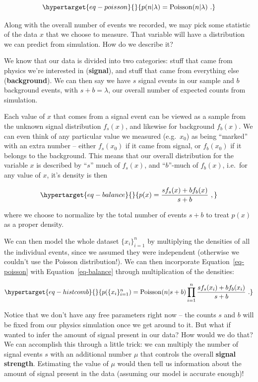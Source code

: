 \documentclass[
  11pt,
  numbers=noendperiod]{book}
\begin{document}
\begin{equation}\protect\hypertarget{eq-poisson}{}{
p(n|\lambda) = \mathrm{Poisson}(n|\lambda)~.
}\label{eq-poisson}\end{equation}

Along with the overall number of events we recorded, we may pick some
statistic of the data \(x\) that we choose to measure. That variable
will have a distribution we can predict from simulation. How do we
describe it?

We know that our data is divided into two categories: stuff that came
from physics we're interested in (\textbf{signal}), and stuff that came
from everything else (\textbf{background}). We can then say we have
\(s\) signal events in our sample and \(b\) background events, with
\(s+b=\lambda\), our overall number of expected counts from simulation.

Each value of \(x\) that comes from a signal event can be viewed as a
sample from the unknown signal distribution \(f_s(x)\), and likewise for
background \(f_b(x)\). We can even think of any particular value we
measured (e.g.~\(x_0\)) as being ``marked'' with an extra number --
either \(f_s(x_0)\) if it came from signal, or \(f_b(x_0)\) if it
belongs to the background. This means that our overall distribution for
the variable \(x\) is described by ``\(s\)'' much of \(f_s(x)\), and
``\(b\)''-much of \(f_b(x)\), i.e.~for any value of \(x\), it's density
is then

\begin{equation}\protect\hypertarget{eq-balance}{}{
p(x) = \frac{sf_s(x) + bf_b(x)}{s+b}~,
}\label{eq-balance}\end{equation}

where we choose to normalize by the total number of events \(s+b\) to
treat \(p(x)\) as a proper density.

We can then model the whole dataset \(\{x_i\}_{i=1}^n\) by multiplying
the densities of all the individual events, since we assumed they were
independent (otherwise we couldn't use the Poisson distribution!). We
can then incorporate Equation~\ref{eq-poisson} with
Equation~\ref{eq-balance} through multiplication of the densities:

\begin{equation}\protect\hypertarget{eq-histcomb}{}{
p(\{x_i\}_{i=1}^n) = \mathrm{Poisson}(n|s+b)\prod_{i=1}^n\frac{sf_s(x_i) + bf_b(x_i)}{s+b}~.
}\label{eq-histcomb}\end{equation}

Notice that we don't have any free parameters right now -- the counts
\(s\) and \(b\) will be fixed from our physics simulation once we get
around to it. But what if wanted to infer the amount of signal present
in our data? How would we do that? We can accomplish this through a
little trick: we can multiply the number of signal events \(s\) with an
additional number \(\mu\) that controls the overall \textbf{signal
strength}. Estimating the value of \(\mu\) would then tell us
information about the amount of signal present in the data (assuming our
model is accurate enough)!
\end{document}
